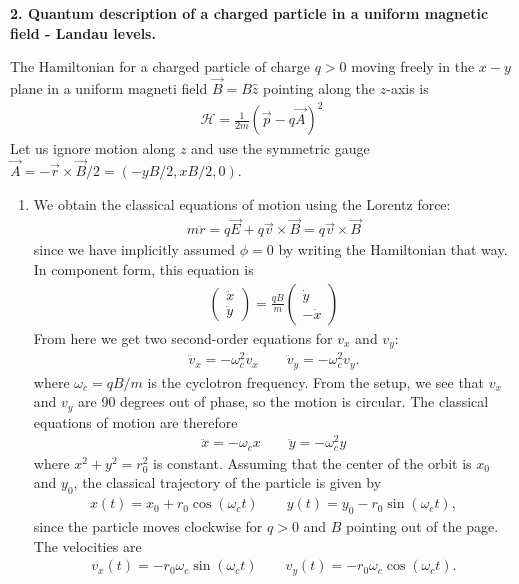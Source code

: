 \documentclass{article}
\theoremstyle{definition}
\newcommand{\ham}{\mathcal{H}}
\newcommand{\f}[2]{\frac{#1}{#2}}
\newcommand{\lp}{\left(}
\newcommand{\rp}{\right)}
\begin{document}
\noindent \textbf{2. Quantum description of a charged particle in a uniform magnetic field - Landau levels.}

\noindent The Hamiltonian for a charged particle of charge $q>0$ moving freely in the $x-y$ plane in a uniform magneti field $\vec{B} = B\hat{z}$ pointing along the $z$-axis is
\begin{align*}
	\ham = \f{1}{2m}\lp \vec{p} - q\vec{A} \rp^2
\end{align*}
Let us ignore motion along $z$ and use the symmetric gauge $\vec{A} = -\vec{r}\times \vec{B}/2 = (-yB/2, xB/2,0)$. 

\begin{enumerate}[label=\alph*)]
	
	\item We obtain the classical equations of motion using the Lorentz force:
	\begin{align*}
		m\ddot{r} = q\vec{E} + q \vec{v}\times \vec{B} = q \vec{v} \times \vec{B}
	\end{align*}
	since we have implicitly assumed $\phi = 0$ by writing the Hamiltonian that way. In component form, this equation is 
	\begin{align*}
		\begin{pmatrix}
			\ddot{x} \\ \ddot{y}
		\end{pmatrix}
	= \f{qB}{m}\begin{pmatrix}
		\dot{y} \\ -\dot{x}  
	\end{pmatrix} 
	\end{align*}
	From here we get two second-order equations for $v_x$ and $v_y$: 
	\begin{align*}
		\ddot{v}_x = -\omega_c^2 v_x \quad\quad \ddot{v}_y = -\omega_c^2 v_y.
	\end{align*}
	where $\omega_c = qB/m$ is the cyclotron frequency. From the setup, we see that $v_x$ and $v_y$ are 90 degrees out of phase, so the motion is circular. The classical equations of motion are therefore
	\begin{align*}
		\ddot{x} = -\omega_c x \quad\quad \ddot{y} = -\omega_c^2 y 
	\end{align*}
	where $x^2 + y^2 = r_0^2 $ is constant. Assuming that the center of the orbit is $x_0$ and $y_0$, the classical trajectory of the particle is given by 
	\begin{align*}
		x(t) = x_0 + r_0\cos(\omega_c t ) \quad\quad 
		y(t) = y_0 - r_0\sin(\omega_c t ),
	\end{align*}
	since the particle moves clockwise for $q>0$ and $B$ pointing out of the page. The velocities are
	\begin{align*}
		v_x(t) = -r_0\omega_c \sin(\omega_c t ) \quad\quad 
		v_y(t) = -r_0\omega_c \cos(\omega_c t ).
	\end{align*}


\end{enumerate}
\end{document}
